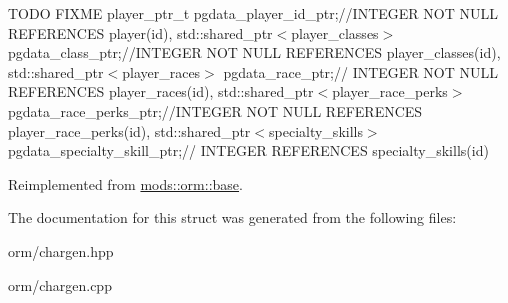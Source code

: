 T\+O\+DO F\+I\+X\+ME player\+\_\+ptr\+\_\+t pgdata\+\_\+player\+\_\+id\+\_\+ptr;//\+I\+N\+T\+E\+G\+ER N\+OT N\+U\+LL R\+E\+F\+E\+R\+E\+N\+C\+ES player(id), std\+::shared\+\_\+ptr$<$player\+\_\+classes$>$ pgdata\+\_\+class\+\_\+ptr;//\+I\+N\+T\+E\+G\+ER N\+OT N\+U\+LL R\+E\+F\+E\+R\+E\+N\+C\+ES player\+\_\+classes(id), std\+::shared\+\_\+ptr$<$player\+\_\+races$>$ pgdata\+\_\+race\+\_\+ptr;// I\+N\+T\+E\+G\+ER N\+OT N\+U\+LL R\+E\+F\+E\+R\+E\+N\+C\+ES player\+\_\+races(id), std\+::shared\+\_\+ptr$<$player\+\_\+race\+\_\+perks$>$ pgdata\+\_\+race\+\_\+perks\+\_\+ptr;//\+I\+N\+T\+E\+G\+ER N\+OT N\+U\+LL R\+E\+F\+E\+R\+E\+N\+C\+ES player\+\_\+race\+\_\+perks(id), std\+::shared\+\_\+ptr$<$specialty\+\_\+skills$>$ pgdata\+\_\+specialty\+\_\+skill\+\_\+ptr;// I\+N\+T\+E\+G\+ER R\+E\+F\+E\+R\+E\+N\+C\+ES specialty\+\_\+skills(id)

Reimplemented from \hyperlink{structmods_1_1orm_1_1base}{mods\+::orm\+::base}.



The documentation for this struct was generated from the following files\+:\begin{DoxyCompactItemize}
\item 
orm/chargen.\+hpp\item 
orm/chargen.\+cpp\end{DoxyCompactItemize}
